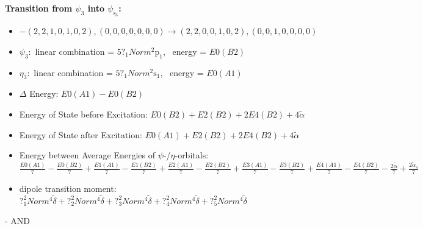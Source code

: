 \documentclass[12pt,a4paper]{article}
\begin{document}
        \noindent\textbf{Transition from $\psi_{3}$ into $\psi_{\text{s}_{3}}$:}
        \begin{itemize}
            \item $- (2, 2, 1, 0, 1, 0, 2), (0, 0, 0, 0, 0, 0, 0) \rightarrow (2, 2, 0, 0, 1, 0, 2), (0, 0, 1, 0, 0, 0, 0)$
        
            \item $\psi_{3}:$ linear combination = $5 ?_{1} Norm^{2} \text{p}_{1}$, \
            energy = $E0(B2)$
            
            \item $\eta_{3}:$ linear combination = $5 ?_{1} Norm^{2} \text{s}_{1}$, \
            energy = $E0(A1)$
            
                \item $\Delta$ Energy: $E0(A1) - E0(B2)$
                \item Energy of State before Excitation: $E0(B2) + E2(B2) + 2 E4(B2) + 4 \tilde{\alpha}$
                \item Energy of State after Excitation: $E0(A1) + E2(B2) + 2 E4(B2) + 4 \tilde{\alpha}$
                \item Energy between Average Energies of $\psi$-/$\eta$-orbitals: $\frac{E0(A1)}{7} - \frac{E0(B2)}{7} + \frac{E1(A1)}{7} - \frac{E1(B2)}{7} + \frac{E2(A1)}{7} - \frac{E2(B2)}{7} + \frac{E3(A1)}{7} - \frac{E3(B2)}{7} + \frac{E4(A1)}{7} - \frac{E4(B2)}{7} - \frac{2 \tilde{\alpha}}{7} + \frac{2 \tilde{\alpha}_{s}}{7}$
            
            \item dipole transition moment: $?_{1}^{2} Norm^{4} \tilde{\delta} + ?_{2}^{2} Norm^{4} \tilde{\delta} + ?_{3}^{2} Norm^{4} \tilde{\delta} + ?_{4}^{2} Norm^{4} \tilde{\delta} + ?_{5}^{2} Norm^{4} \tilde{\delta}$
        
        \end{itemize}
        
 -  AND 
\end{document}
